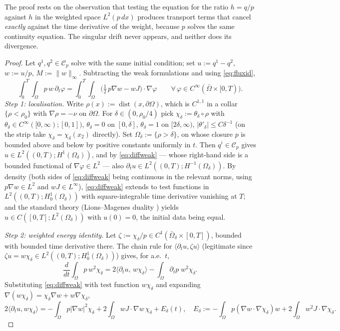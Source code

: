 \documentclass[11pt]{amsart}
\theoremstyle{definition}
\newcommand{\dd}{\,d}
\begin{document}
The proof rests on the observation that testing the equation
for the ratio $h=q/p$ against $h$ in the weighted space
$L^2(p\dd x)$ produces transport terms that cancel \emph{exactly}
against the time derivative of the weight, because $p$ solves the
same continuity equation. The singular drift never appears, and
neither does its divergence.

\begin{proof}
Let $q^1,q^2\in\mathcal{C}_p$ solve with the same initial condition; set
$u:=q^1-q^2$, $w:=u/p$, $M:=\|w\|_\infty$. Subtracting the weak
formulations and using \eqref{eq:fluxid},
\begin{equation}\label{eq:diffweak}
\int_0^T\!\!\int_\Omega p\,w\,\partial_t\varphi
=\int_0^T\!\!\int_\Omega\Big(\tfrac12\,p\nabla w-
wJ\Big)\cdot\nabla\varphi
\qquad\forall\,\varphi\in C^\infty(\bar\Omega\times[0,T)).
\end{equation}
\emph{Step 1: localisation.} Write
$\rho(x):=\operatorname{dist}(x,\partial\Omega)$, which is $C^{1,1}$
in a collar $\{\rho<\rho_0\}$ with $\nabla\rho=-\nu$ on
$\partial\Omega$. For $\delta\in(0,\rho_0/4)$ pick
$\chi_\delta:=\theta_\delta\circ\rho$ with
$\theta_\delta\in C^\infty([0,\infty);[0,1])$, $\theta_\delta=0$ on
$[0,\delta]$, $\theta_\delta=1$ on $[2\delta,\infty)$,
$|\theta'_\delta|\le C\delta^{-1}$ (on the strip take
$\chi_\delta=\chi_\delta(x_2)$ directly). Set
$\Omega_\delta:=\{\rho>\delta\}$, on whose closure $p$ is bounded
above and below by positive constants uniformly in $t$. Then
$q^i\in\mathcal{C}_p$ gives
$u\in L^2((0,T);H^1(\Omega_\delta))$, and by \eqref{eq:diffweak} ---
whose right-hand side is a bounded functional of
$\nabla\varphi\in L^2$ --- also $\partial_tu\in
L^2((0,T);H^{-1}(\Omega_\delta))$. By density (both sides of
\eqref{eq:diffweak} being continuous in the relevant norms, using
$p\nabla w\in L^2$ and $wJ\in L^\infty$), \eqref{eq:diffweak}
extends to test functions in $L^2((0,T);H^1_0(\Omega_\delta))$ with
square-integrable time derivative vanishing at $T$; and the standard
theory (Lions--Magenes duality \cite{Temam}) yields
$u\in C([0,T];L^2(\Omega_\delta))$ with $u(0)=0$, the initial data
being equal.

\emph{Step 2: weighted energy identity.} Let
$\zeta:=\chi_\delta/p\in C^1(\bar\Omega_\delta\times[0,T])$,
bounded with bounded time derivative there. The chain rule for
$\langle\partial_tu,\zeta u\rangle$ (legitimate since
$\zeta u=w\chi_\delta\in L^2((0,T);H^1_0(\Omega_\delta))$) gives,
for a.e.\ $t$,
\[
\frac{d}{dt}\int_\Omega p\,w^2\chi_\delta
=2\big\langle\partial_tu,\,w\chi_\delta\big\rangle
-\int_\Omega\partial_tp\;w^2\chi_\delta .
\]
Substituting \eqref{eq:diffweak} with test function $w\chi_\delta$
and expanding
$\nabla(w\chi_\delta)=\chi_\delta\nabla w+w\nabla\chi_\delta$,
\[
2\big\langle\partial_tu,w\chi_\delta\big\rangle
=-\int_\Omega p|\nabla w|^2\chi_\delta
+2\int_\Omega wJ\cdot\nabla w\,\chi_\delta+E_\delta(t),
\quad
E_\delta:=-\!\int_\Omega p(\nabla w\cdot\nabla\chi_\delta)w
+2\!\int_\Omega w^2J\cdot\nabla\chi_\delta .
\]


\end{proof}
\end{document}
